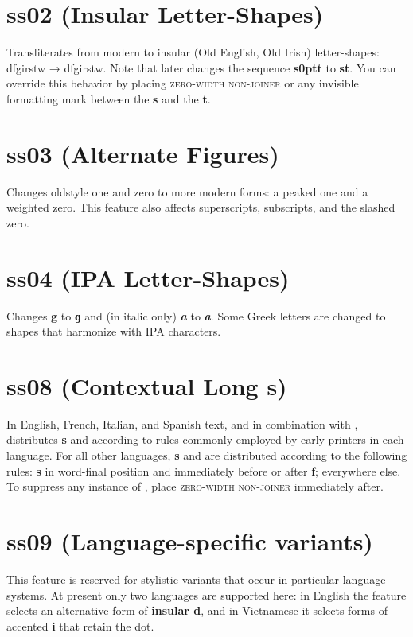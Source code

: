 \documentclass[12pt,letterpaper,openany]{book}
\begin{document}
\section{ss02 (Insular Letter-Shapes)}
Transliterates from modern to insular (Old English, Old Irish) letter-shapes:\linebreak
dfgirstw → { dfgirstw}. Note that  later
changes the sequence \textbf{ s\kern0ptt}
to \textbf{ st}. You can override this behavior by placing
 \textsc{zero-width non-joiner} or any invisible formatting mark
between the \textbf{s} and the \textbf{t}.

\section{ss03 (Alternate Figures)}
Changes oldstyle one and zero to more modern forms: a peaked one and a weighted zero. This
feature also affects superscripts, subscripts, and the slashed zero.

\section{ss04 (IPA Letter-Shapes)}
Changes \textbf{g} to \textbf{ɡ} and (in italic only)
\textbf{\textit{a}} to \textbf{\textit{ a}}. Some Greek letters
are changed to shapes that harmonize with IPA characters.

\section{ss08 (Contextual Long s)}
In English, French, Italian, and Spanish text, and in combination with , distributes \textbf{s} and
\textbf{}
according to rules commonly employed by early printers in each language. For all other languages,
\textbf{s} and \textbf{} are distributed according to the following rules:
\textbf{s} in word-final position and immediately before or after \textbf{f};
\textbf{} everywhere else. To suppress any instance of \textbf{},
place  \textsc{zero-width non-joiner} immediately after.

\section{ss09  (Language-specific variants)}
This feature is reserved for stylistic variants that occur in particular language
systems. At present only two languages are supported here: in English the feature
selects an alternative form of \textbf{insular d}, and in Vietnamese it selects forms of
accented \textbf{i} that retain the dot.
\end{document}
